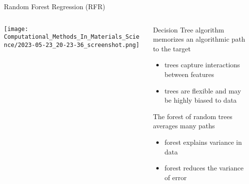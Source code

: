 \documentclass[10pt, aspectratio=169, presentation]{beamer}
\begin{document}
\begin{frame}[label={sec:org416c339}]{Random Forest Regression (RFR)}
\begin{columns}
\begin{column}{0.6\columnwidth}
\begin{center}
\texttt{[image: Computational\_Methods\_In\_Materials\_Science/2023-05-23\_20-23-36\_screenshot.png]}
\end{center}
\end{column}

\begin{column}{0.4\columnwidth}
Decision Tree algorithm memorizes an algorithmic path to the target
\begin{itemize}
\item trees capture interactions between features
\item trees are flexible and may be highly biased to data
\end{itemize}
The forest of random trees averages many paths
\begin{itemize}
\item forest explains variance in data
\item forest reduces the variance of error
\end{itemize}
\end{column}
\end{columns}
\end{frame}
\end{document}
